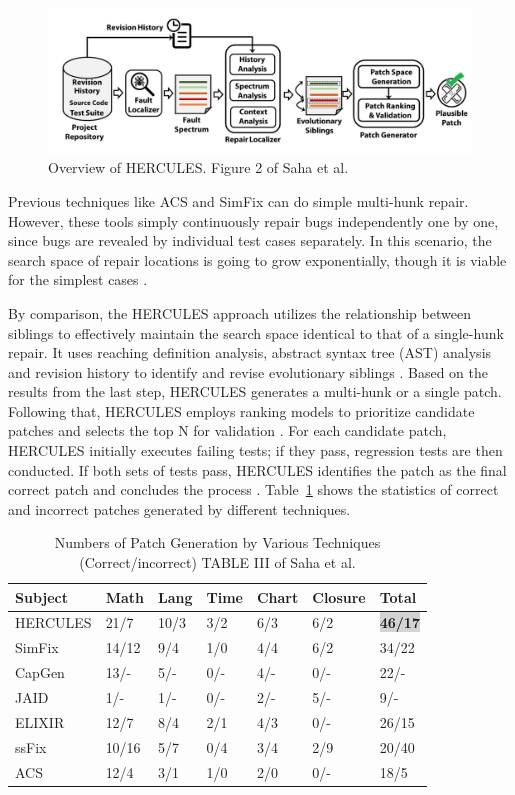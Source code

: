 \documentclass[runningheads]{llncs}
\begin{document}
\begin{figure}
\includegraphics[width=\textwidth]{overview}
\caption{Overview of HERCULES. Figure 2 of Saha et al.\cite{0_ref_proc1}} \label{fig1}
\end{figure}

Previous techniques like ACS and SimFix can do simple multi-hunk repair. However, these tools simply continuously repair bugs independently one by one, since bugs are revealed by individual test cases separately. In this scenario, the search space of repair locations is going to grow exponentially, though it is viable for the simplest cases \cite{0_ref_proc1}.

By comparison, the HERCULES approach utilizes the relationship between siblings to effectively maintain the search space identical to that of a single-hunk repair. It uses reaching definition analysis, abstract syntax tree (AST) analysis and revision history to identify and revise evolutionary siblings \cite{0_ref_proc1}. Based on the results from the last step, HERCULES generates a multi-hunk or a single patch\cite{0_ref_proc1}. Following that, HERCULES employs ranking models to prioritize candidate patches and selects the top N for validation \cite{0_ref_proc1}. For each candidate patch, HERCULES initially executes failing tests; if they pass, regression tests are then conducted. If both sets of tests pass, HERCULES identifies the patch as the final correct patch and concludes the process \cite{0_ref_proc1}.
Table~\ref{tab1} shows the statistics of correct and incorrect patches generated by different techniques.

\begin{table}
\centering
\caption{Numbers of Patch Generation by Various Techniques (Correct/incorrect) TABLE III of Saha et al.\cite{0_ref_proc1}}\label{tab1}
\begin{tabular}{l l l l l l l}
\hline
{\bfseries Subject} &  {\bfseries Math} & {\bfseries Lang} & {\bfseries Time} & {\bfseries Chart} & {\bfseries Closure} & {\bfseries Total}\\
\hline
HERCULES &  21/7 & 10/3 & 3/2 & 6/3 & 6/2 & \colorbox{lightgray} {\bfseries46/17}\\
SimFix &  14/12 & 9/4 & 1/0 & 4/4 & 6/2 & 34/22\\
CapGen &  13/- & 5/- & 0/- & 4/- & 0/- & 22/-\\
JAID &  1/- & 1/- & 0/- & 2/- & 5/- & 9/-\\
ELIXIR &  12/7 & 8/4 & 2/1 & 4/3 & 0/- & 26/15\\
ssFix &  10/16 & 5/7 & 0/4 & 3/4 & 2/9 & 20/40\\
ACS &  12/4 & 3/1 & 1/0 & 2/0 & 0/- & 18/5\\
\hline
\end{tabular}
\end{table}
\end{document}
